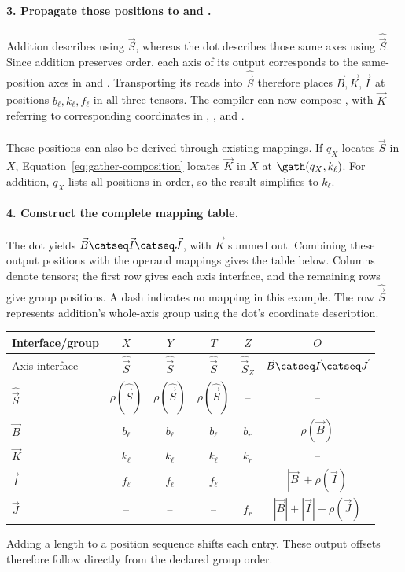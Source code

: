 \paragraph{3. Propagate those positions to  and .}
Addition describes  using $\vec S$, whereas the dot describes those same
axes using $\widehat{\vec S}$. Since addition preserves order, each axis of its
output corresponds to the same-position axes in  and .
Transporting its reads into $\widehat{\vec S}$ therefore places $\vec B,\vec K,\vec I$ at positions
$b_\ell,k_\ell,f_\ell$ in all three tensors. The compiler can now compose
, with $\vec K$ referring to corresponding
coordinates in , , and .

These positions can also be derived through existing mappings. If $q_X$
locates $\widehat{\vec S}$ in $X$, Equation~\eqref{eq:gather-composition} locates
$\vec K$ in $X$ at $\gath(q_X,k_\ell)$. For addition, $q_X$ lists all positions
in order, so the result simplifies to $k_\ell$.

\paragraph{4. Construct the complete mapping table.}
The dot yields $\vec B\catseq \vec I\catseq \vec J$, with $\vec K$ summed out. Combining these
output positions with the operand mappings gives the table below.
Columns denote tensors; the first row gives each axis interface, and the
remaining rows give group positions. A dash indicates no mapping in this
example. The row $\widehat{\vec S}$ represents addition's whole-axis group using
the dot's coordinate description.
\begin{center}
\begin{tabular}{@{}lccccc@{}}\toprule
Interface/group & $X$ & $Y$ & $T$ & $Z$ & $O$\\\midrule
Axis interface & $\widehat{\vec S}$ & $\widehat{\vec S}$ & $\widehat{\vec S}$ & $\widehat{\vec S}_Z$ & $\vec B\catseq \vec I\catseq \vec J$\\
$\widehat{\vec S}$ & $\rho(\widehat{\vec S})$ & $\rho(\widehat{\vec S})$ & $\rho(\widehat{\vec S})$ & -- & --\\
$\vec B$ & $b_\ell$ & $b_\ell$ & $b_\ell$ & $b_r$ & $\rho(\vec B)$\\
$\vec K$ & $k_\ell$ & $k_\ell$ & $k_\ell$ & $k_r$ & --\\
$\vec I$ & $f_\ell$ & $f_\ell$ & $f_\ell$ & -- & $|\vec B|+\rho(\vec I)$\\
$\vec J$ & -- & -- & -- & $f_r$ & $|\vec B|+|\vec I|+\rho(\vec J)$\\\bottomrule
\end{tabular}
\end{center}
Adding a length to a position sequence shifts each entry. These output
offsets therefore follow directly from the declared group order.


